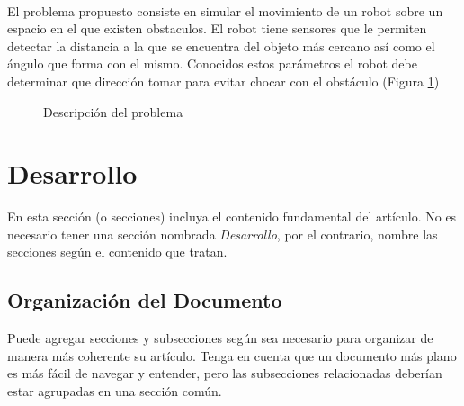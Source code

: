 \documentclass[a4paper,10pt,twocolumn]{article}
\begin{document}
  \paragraph{}   El problema propuesto consiste en simular el movimiento de un robot sobre un espacio en el que existen obstaculos.
  El robot tiene sensores que le permiten detectar la distancia a la que se encuentra del objeto más cercano así como el ángulo que forma
  con el mismo. Conocidos estos parámetros el robot debe determinar que dirección tomar para evitar chocar con el obstáculo (Figura \ref{ex})
  
	\begin{figure}[htb]%
		\begin{center}
			\setlength\fboxsep{0pt}
			\setlength\fboxrule{1.5pt}
		\end{center}
		\caption{Descripción del problema \label{ex}}%
	\end{figure}




\section{Desarrollo}\label{sec:dev}
  En esta sección (o secciones) incluya el contenido fundamental del artículo.
  No es necesario tener una sección nombrada \emph{Desarrollo}, por el contrario,
  nombre las secciones según el contenido que tratan.

	\subsection{Organización del Documento}\label{sub:results}
		Puede agregar secciones y subsecciones según sea necesario para organizar
		de manera más coherente su artículo. Tenga en cuenta que un documento más
		plano es más fácil de navegar y entender, pero las subsecciones relacionadas
		deberían estar agrupadas en una sección común.
\end{document}
